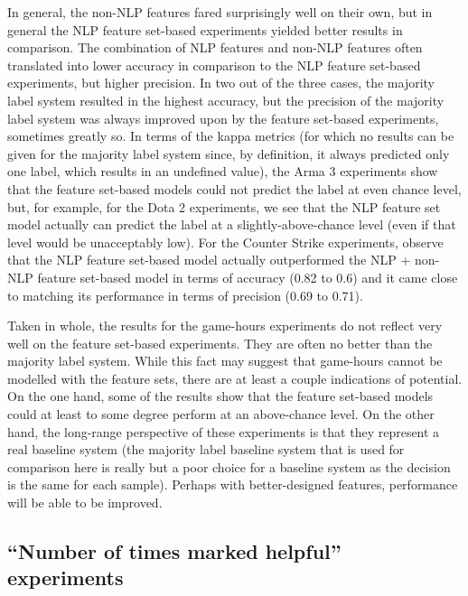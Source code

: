 \documentclass[9pt]{article}
\begin{document}
In general, the non-NLP features fared surprisingly well on their own, but in general the NLP feature set-based experiments yielded better results in comparison. The combination of NLP features and non-NLP features often translated into lower accuracy in comparison to the NLP feature set-based experiments, but higher precision. In two out of the three cases, the majority label system resulted in the highest accuracy, but the precision of the majority label system was always improved upon by the feature set-based experiments, sometimes greatly so. In terms of the kappa metrics (for which no results can be given for the majority label system since, by definition, it always predicted only one label, which results in an undefined value), the Arma 3 experiments show that the feature set-based models could not predict the label at even chance level, but, for example, for the Dota 2 experiments, we see that the NLP feature set model actually can predict the label at a slightly-above-chance level (even if that level would be unacceptably low). For the Counter Strike experiments, observe that the NLP feature set-based model actually outperformed the NLP + non-NLP feature set-based model in terms of accuracy (0.82 to 0.6) and it came close to matching its performance in terms of precision (0.69 to 0.71).

Taken in whole, the results for the game-hours experiments do not reflect very well on the feature set-based experiments. They are often no better than the majority label system. While this fact may suggest that game-hours cannot be modelled with the feature sets, there are at least a couple indications of potential. On the one hand, some of the results show that the feature set-based models could at least to some degree perform at an above-chance level. On the other hand, the long-range perspective of these experiments is that they represent a real baseline system (the majority label baseline system that is used for comparison here is really but a poor choice for a baseline system as the decision is the same for each sample). Perhaps with better-designed features, performance will be able to be improved.

\subsection{``Number of times marked helpful'' experiments}
\label{ssec:helpful}
\end{document}
